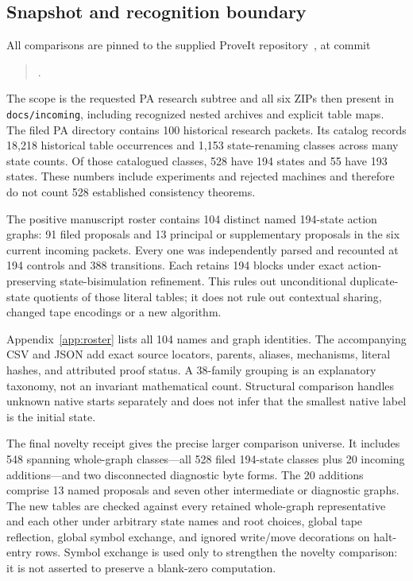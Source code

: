 \documentclass[11pt]{article}
\begin{document}
\subsection{Snapshot and recognition boundary}
All comparisons are pinned to the supplied ProveIt repository~\cite{snapshot,catalog}, at commit
\begin{quote}\footnotesize{}.\end{quote}
The scope is the requested PA research subtree and all six ZIPs then present in \texttt{docs/incoming}, including recognized nested archives and explicit table maps. The filed PA directory contains 100 historical research packets. Its catalog records 18,218 historical table occurrences and 1,153 state-renaming classes across many state counts. Of those catalogued classes, 528 have 194 states and 55 have 193 states. These numbers include experiments and rejected machines and therefore do not count 528 established consistency theorems.

The positive manuscript roster contains 104 distinct named 194-state action graphs: 91 filed proposals and 13 principal or supplementary proposals in the six current incoming packets. Every one was independently parsed and recounted at 194 controls and 388 transitions. Each retains 194 blocks under exact action-preserving state-bisimulation refinement. This rules out unconditional duplicate-state quotients of those literal tables; it does not rule out contextual sharing, changed tape encodings or a new algorithm.

Appendix~\ref{app:roster} lists all 104 names and graph identities. The accompanying CSV and JSON add exact source locators, parents, aliases, mechanisms, literal hashes, and attributed proof status. A 38-family grouping is an explanatory taxonomy, not an invariant mathematical count. Structural comparison handles unknown native starts separately and does not infer that the smallest native label is the initial state.

The final novelty receipt gives the precise larger comparison universe. It includes 548 spanning whole-graph classes---all 528 filed 194-state classes plus 20 incoming additions---and two disconnected diagnostic byte forms. The 20 additions comprise 13 named proposals and seven other intermediate or diagnostic graphs. The new tables are checked against every retained whole-graph representative and each other under arbitrary state names and root choices, global tape reflection, global symbol exchange, and ignored write/move decorations on halt-entry rows. Symbol exchange is used only to strengthen the novelty comparison: it is not asserted to preserve a blank-zero computation.
\end{document}
